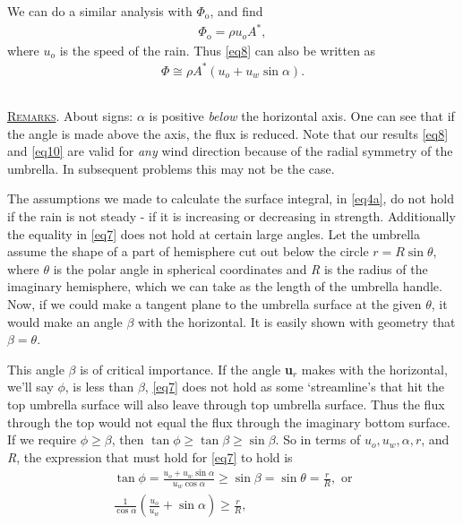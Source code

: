 \documentclass[11pt]{article}
\begin{document}
\vspace{10pt} We can do a similar analysis with $\Phi_{\text{o}}$, and find
\begin{align} \label{eq9}
\Phi_{\text{o}} = \rho u_o A^*,
\end{align}
where $u_o$ is the speed of the rain. Thus \eqref{eq8} can also be written as
\begin{align} \label{eq10}
\boxed{\Phi \cong \rho A^* (u_o + u_w \sin{\alpha})}.
\end{align}

\subsection[Remarks]{} \textsc{\underline{Remarks}}. About signs: $\alpha$ is positive \textit{below} the horizontal axis. One can see that if the angle is made above the axis, the flux is reduced. Note that our results \eqref{eq8} and \eqref{eq10} are valid for \textit{any} wind direction because of the radial symmetry of the umbrella. In subsequent problems this may not be the case.

\vspace{10pt} The assumptions we made to calculate the surface integral, in \eqref{eq4a}, do not hold if the rain is not steady - if it is increasing or decreasing in strength. Additionally the equality in \eqref{eq7} does not hold at certain large angles. Let the umbrella assume the shape of a part of hemisphere cut out below the circle $r = R \sin \theta$, where $\theta$ is the polar angle in spherical coordinates and \textit{R} is the radius of the imaginary hemisphere, which we can take as the length of the umbrella handle. Now, if we could make a tangent plane to the umbrella surface at the given $\theta$, it would make an angle $\beta$ with the horizontal. It is easily shown with geometry that $\beta = \theta$. 

\vspace{10pt} This angle $\beta$ is of critical importance. If the angle \textbf{u}$_r$ makes with the horizontal, we'll say $\phi$, is less than $\beta$, \eqref{eq7} does not hold as some `streamline's that hit the top umbrella surface will also leave through top umbrella surface. Thus the flux through the top would not equal the flux through the imaginary bottom surface. If we require $\phi \geq \beta$, then $\tan \phi \geq \tan \beta \geq \sin \beta$. So in terms of $u_o, u_w, \alpha, r$, and \textit{R}, the expression that must hold for \eqref{eq7} to hold is
\begin{gather} 
\tan \phi = \frac{u_o + u_w \sin \alpha}{u_w \cos \alpha} \geq \sin \beta = \sin \theta = \frac{r}{R}, \text{ or} \nonumber \\[0.4em]
\frac{1}{\cos \alpha} \left(\frac{u_o}{u_w} + \sin \alpha \right) \geq \frac{r}{R}, \label{eq10b}
\end{gather}
\end{document}
